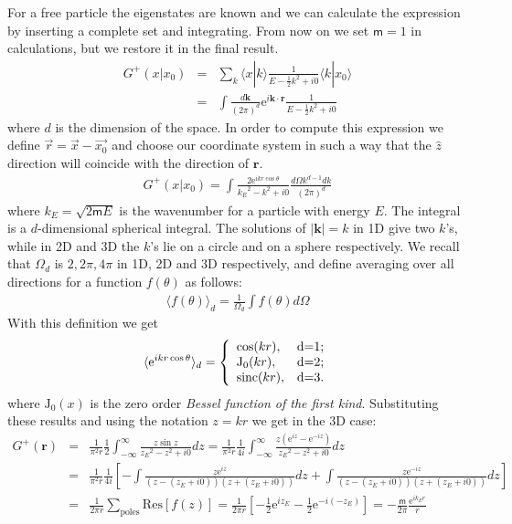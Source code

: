 \documentclass[onecolumn,fleqn]{revtex4}
\newcommand{\sinc}{\mathrm{sinc}}
\newcommand{\eexp}{\mathrm{e}^}
\newcommand{\mass}{\mathsf{m}}
\newcommand{\tbox}[1]{\text{#1}}
\newcommand{\beq}{\begin{eqnarray}}
\newcommand{\eeq}{\end{eqnarray}}
\begin{document}
For a free particle the eigenstates are known and we can calculate 
the expression by inserting a complete set and integrating.
From now on we set $\mass=1$ in calculations, but we restore it in 
the final result.
\beq
G^+(x|x_0)&=&
\sum_k\langle x|k\rangle \frac{1}{E-\frac 12 k^2 +i0}\langle k|x_0 \rangle 
\\ \nonumber
&=&\int\frac{d\mathbf{k}}{(2\pi)^d}\eexp{i\mathbf{k}\cdot\mathbf{r}}
\frac{1}{E-\frac 12 k^2 +i0}
\eeq
where $d$ is the dimension of the space. In order to compute this expression 
we define $\vec{r}=\vec{x}-\vec{x_0}$
and choose our coordinate system in such a way 
that the $\hat{z}$ direction will coincide with the direction of $\mathbf{r}$.
\beq
G^+(x|x_0)=\int \frac{2\eexp{ikr\cos\theta}}{{k_E}^2-k^2+i0}\frac{d\Omega k^{d-1}dk}{(2\pi)^d}
\eeq
where $k_E=\sqrt{2 \mass E}$ is the wavenumber for a particle with energy $E$. The integral is a
$d$-dimensional spherical integral. The solutions of $|\mathbf{k}|=k$ in 1D give two $k$'s, 
while in 2D and 3D the $k$'s lie on a circle and on a sphere respectively. 
We recall that $\Omega_d$ is $2,2\pi,4\pi$ in 1D, 2D and 3D respectively, and define   
averaging over all directions for a function $f(\theta)$ as follows:
\beq
\langle f(\theta)\rangle_d=\frac{1}{\Omega_d}\int f(\theta) d\Omega
\eeq
With this definition we get
\beq
\langle \eexp{ikr\cos\theta}\rangle_d
=\left\{
\begin{array}{ll}
\cos(kr), & \hbox{d=1;} \\
\mathrm{J_0}(kr), & \hbox{d=2;} \\
\sinc(kr), & \hbox{d=3.} \\
\end{array}
\right.
\eeq
where $\mathrm{J_0}(x)$ is the zero order \textit{Bessel function of the first kind}. 
Substituting these results and using the notation $z=kr$ we get in the 3D case:
\beq
G^+(\mathbf{r})
&=&
\frac{1}{\pi^2 r} 
\frac 12 {\int_{-\infty}^\infty} 
\frac{z\sin z}{{z_E}^2-z^2+i0}dz
=
\frac{1}{\pi^2 r} 
\frac {1}{4i} 
{\int_{-\infty}^\infty} 
\frac{z(\eexp{iz}-\eexp{-iz})}{{z_E}^2-z^2+i0}dz 
\\ \nonumber
&=&
\frac{1}{\pi^2 r} 
\frac {1}{4i}                     
\left[-\int \frac{z \eexp{iz}}{(z-(z_E+i0))(z+(z_E+i0))}dz                          
+\int \frac{z \eexp{-iz}}{(z-(z_E+i0))(z+(z_E+i0))}dz\right] 
\\ \nonumber
&=&
\frac{1}{2\pi r}
\sum_{\tbox{poles}}\mathrm{Res}[f(z)]
=
\frac{1}{2\pi r} 
\left[-\frac 12 \eexp{iz_E}-\frac 12 \eexp{-i(-z_E)}\right]
=
-\frac{\mass}{2\pi} \frac{\eexp{ik_E r}}{r}
\eeq
\end{document}
